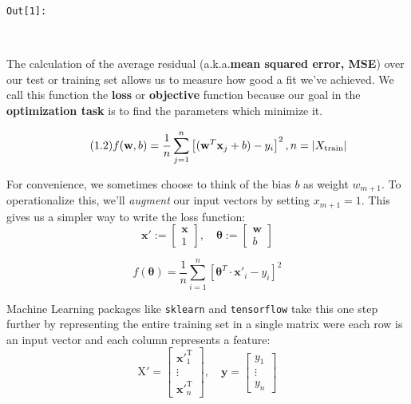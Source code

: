 \documentclass[11pt]{article}
\begin{document}
\texttt{\color{outcolor}Out[{\color{outcolor}1}]:}
    
    \begin{center}
    \end{center}
    { \hspace*{\fill} \\}
    

    The calculation of the average residual (a.k.a.\textbf{mean squared
error, MSE}) over our test or training set allows us to measure how good
a fit we've achieved. We call this function the \textbf{loss} or
\textbf{objective} function because our goal in the \textbf{optimization
task} is to find the parameters which minimize it.

\begin{equation}\tag{1.2}
f(\mathbf{w}, b) = \frac{1}{n}\sum_{j=1}^{n}\left[ (\mathbf{w}^T\mathbf{x}_j + b) - y_i\right]^2,\\
n = \left|X_{\text{train}}\right|
\end{equation}

For convenience, we sometimes choose to think of the bias \(b\) as
weight \(w_{m+1}\). To operationalize this, we'll \emph{augment} our
input vectors by setting \(x_{m+1}=1\). This gives us a simpler way to
write the loss function: \[
\mathbf{x}' :=
\begin{bmatrix}
\mathbf{x}\\
1
\end{bmatrix},\quad
\boldsymbol{\theta} :=
\begin{bmatrix}
\mathbf{w}\\
b
\end{bmatrix}
\]

\begin{equation}\tag{1.3}
f(\boldsymbol{\theta}) = \frac{1}{n}\sum_{i=1}^{n}\left[ \boldsymbol{\theta}^T\cdot\mathbf{x}'_i - y_i\right]^2
\end{equation}

Machine Learning packages like \texttt{sklearn} and \texttt{tensorflow}
take this one step further by representing the entire training set in a
single matrix were each row is an input vector and each column
represents a feature: \[
\text{X}' =
\begin{bmatrix}
\mathbf{x'}_1^{\text{T}}\\
\vdots\\
\mathbf{x'}_n^{\text{T}}
\end{bmatrix},\quad
\mathbf{y} = 
\begin{bmatrix}
y_1\\
\vdots\\
y_n
\end{bmatrix}
\]
\end{document}

